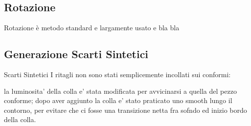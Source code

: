 \subsection {Rotazione}
Rotazione è metodo standard e largamente usato e bla bla

\subsection {Generazione Scarti Sintetici}


Scarti Sintetici
 I ritagli non sono stati semplicemente incollati sui conformi:

 la luminosita' della colla e' stata modificata per avvicinarsi a quella del pezzo conforme;
 dopo aver aggiunto la colla e' stato praticato uno smooth lungo il contorno, per evitare che ci fosse una transizione netta fra sofndo ed inizio bordo della colla.







































